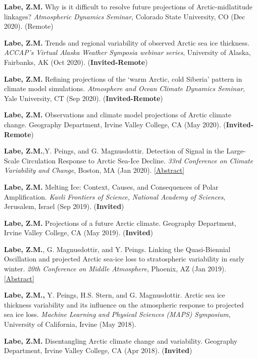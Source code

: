 \documentclass[margin,line,palatino,courier,10pt]{res}
\begin{document}
\begin{resume}
\begin{etaremune}[leftmargin=0in,topsep=0in,parsep=0in]
\item \textbf{Labe, Z.M.} Why is it difficult to resolve future projections of Arctic-midlatitude linkages? \textit{Atmospheric Dynamics Seminar}, Colorado State University, CO (Dec 2020). (Remote)
\item \textbf{Labe, Z.M.} Trends and regional variability of observed Arctic sea ice thickness. \textit{ACCAP’s Virtual Alaska Weather Symposia webinar series}, University of Alaska, Fairbanks, AK (Oct 2020). (\textbf{Invited-Remote})
\item \textbf{Labe, Z.M.} Refining projections of the `warm Arctic, cold Siberia' pattern in climate model simulations. \textit{Atmosphere and Ocean Climate Dynamics Seminar}, Yale University, CT (Sep 2020). (\textbf{Invited-Remote})
\item \textbf{Labe, Z.M.} Observations and climate model projections of Arctic climate change. Geography Department, Irvine Valley College, CA (May 2020). (\textbf{Invited-Remote})
\item \textbf{Labe, Z.M.},Y. Peings, and G. Magnusdottir. Detection of Signal in the Large-Scale Circulation Response to Arctic Sea-Ice Decline. \textit{33rd Conference on Climate Variability and Change}, Boston, MA (Jan 2020). \href{https://ams.confex.com/ams/2020Annual/meetingapp.cgi/Paper/367289}{[Abstract]}
\item \textbf{Labe, Z.M.} Melting Ice: Context, Causes, and Consequences of Polar Amplification. \textit{Kavli Frontiers of Science, National Academy of Sciences}, Jerusalem, Israel (Sep 2019). (\textbf{Invited}) 
\item \textbf{Labe, Z.M.} Projections of a future Arctic climate. Geography Department, Irvine Valley College, CA (May 2019). (\textbf{Invited})
\item \textbf{Labe, Z.M.}, G. Magnusdottir, and Y. Peings. Linking the Quasi-Biennial Oscillation and projected Arctic sea-ice loss to stratospheric variability in early winter. \textit{20th Conference on Middle Atmosphere}, Phoenix, AZ (Jan 2019). \href{https://ams.confex.com/ams/2019Annual/meetingapp.cgi/Paper/352664}{[Abstract]}
\item \textbf{Labe, Z.M.,} Y. Peings, H.S. Stern, and G. Magnusdottir. Arctic sea ice thickness variability and its influence on the atmospheric response to projected sea ice loss. \textit{Machine Learning and Physical Sciences (MAPS) Symposium}, University of California, Irvine (May 2018). 
\item \textbf{Labe, Z.M.} Disentangling Arctic climate change and variability. Geography Department, Irvine Valley College, CA (Apr 2018). (\textbf{Invited})

\end{etaremune}
\end{resume}
\end{document}
